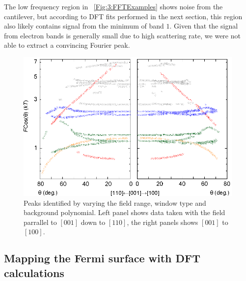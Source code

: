 The low frequency region in \fig~\ref{Fig:3:FFTExamples} shows noise from the cantilever, but according to DFT fits performed in the next section, this region also likely contains signal from the minimum of band $1$. Given that the signal from electron bands is generally small due to high scattering rate, we were not able to extract a convincing Fourier peak.
\begin{figure}[h!]
    \begin{center}
        \includegraphics[scale=0.7]{Chapter3-dHvABaFe2P2/Figures/AngleDepMeasurements/AngleSweepMeasured/AngleSweepMeasured}
        \caption{Peaks identified by varying the field range, window type and background polynomial. Left panel shows data taken with the field parrallel to $[001]$ down to $[110]$, the right panels shows $[001]$ to $[100]$.}
        \label{Fig:3:AngleSweepMeasured}
    \end{center}
\end{figure}

\subsection{Mapping the Fermi surface with DFT calculations}
    \label{Sec:3:MappingFermiSurfaceDFTCalulations}

